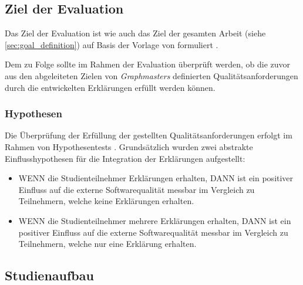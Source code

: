 \subsection{Ziel der Evaluation}

Das Ziel der Evaluation ist wie auch das Ziel der gesamten Arbeit (siehe \autoref{sec:goal_definition}) auf Basis der Vorlage von \citeauthor{wohlin2012experimentation} formuliert \cite{wohlin2012experimentation}.

\smallskip

\noindent{}

\smallskip

Dem zu Folge sollte im Rahmen der Evaluation überprüft werden, ob die zuvor aus den abgeleiteten Zielen von \textit{Graphmasters} definierten Qualitätsanforderungen durch die entwickelten Erklärungen erfüllt werden können.

\subsubsection{Hypothesen}
\label{sec:evaluation_hypothesis}

Die Überprüfung der Erfüllung der gestellten Qualitätsanforderungen erfolgt im Rahmen von Hypothesentests \cite{wohlin2012experimentation}. Grundsätzlich wurden zwei abstrakte Einflusshypothesen für die Integration der Erklärungen aufgestellt:

\begin{itemize}
    \item WENN die Studienteilnehmer Erklärungen erhalten, DANN ist ein positiver Einfluss auf die externe Softwarequalität messbar im Vergleich zu Teilnehmern, welche keine Erklärungen erhalten.
    \item WENN die Studienteilnehmer mehrere Erklärungen erhalten, DANN ist ein positiver Einfluss auf die externe Softwarequalität messbar im Vergleich zu Teilnehmern, welche nur eine Erklärung erhalten.
\end{itemize}

\subsection{Studienaufbau}

